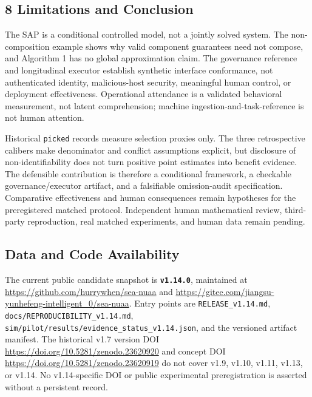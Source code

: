 \documentclass[
  11pt]{article}
\begin{document}
\subsection{8 Limitations and
Conclusion}\label{limitations-and-conclusion}

The SAP is a conditional controlled model, not a jointly solved system.
The non-composition example shows why valid component guarantees need
not compose, and Algorithm 1 has no global approximation claim. The
governance reference and longitudinal executor establish synthetic
interface conformance, not authenticated identity, malicious-host
security, meaningful human control, or deployment effectiveness.
Operational attendance is a validated behavioral measurement, not latent
comprehension; machine ingestion-and-task-reference is not human
attention.

Historical \texttt{picked} records measure selection proxies only. The
three retrospective calibers make denominator and conflict assumptions
explicit, but disclosure of non-identifiability does not turn positive
point estimates into benefit evidence. The defensible contribution is
therefore a conditional framework, a checkable governance/executor
artifact, and a falsifiable omission-audit specification. Comparative
effectiveness and human consequences remain hypotheses for the
preregistered matched protocol. Independent human mathematical review,
third-party reproduction, real matched experiments, and human data
remain pending.

\subsection{Data and Code
Availability}\label{data-and-code-availability}

The current public candidate snapshot is \textbf{\texttt{v1.14.0}},
maintained at \url{https://github.com/hurrywhen/sea-nuaa} and
\url{https://gitee.com/jiangsu-yunhefeng-intelligent_0/sea-nuaa}. Entry
points are \texttt{RELEASE\_v1.14.md},
\texttt{docs/REPRODUCIBILITY\_v1.14.md},
\texttt{sim/pilot/results/evidence\_status\_v1.14.json}, and the
versioned artifact manifest. The historical v1.7 version DOI
\url{https://doi.org/10.5281/zenodo.23620920} and concept DOI
\url{https://doi.org/10.5281/zenodo.23620919} do not cover v1.9, v1.10,
v1.11, v1.13, or v1.14. No v1.14-specific DOI or public experimental
preregistration is asserted without a persistent record.
\end{document}
